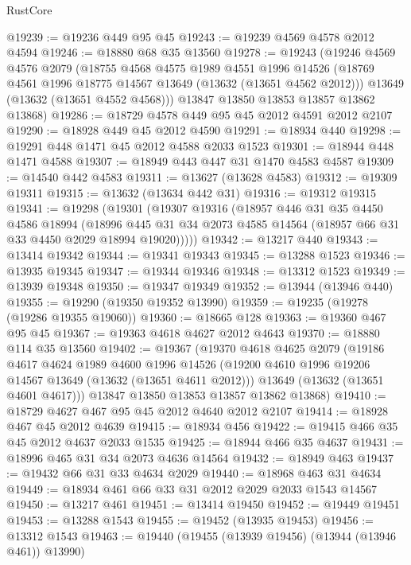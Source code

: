 \begin{lexlean}{RustCore}
\begin{coremodule}
@19239 := @19236 @449 @95 @45
@19243 := @19239 @4569 @4578 @2012 @4594
@19246 := @18880 @68 @35 @13560
@19278 := @19243
    (@19246
      @4569
      @4576
      @2079
      (@18755
        @4568
        @4575
        @1989
        @4551
        @1996
        @14526
        (@18769 @4561 @1996 @18775 @14567 @13649 (@13632 (@13651 @4562 @2012)))
        @13649
        (@13632 (@13651 @4552 @4568)))
      @13847
      @13850
      @13853
      @13857
      @13862
      @13868)
@19286 := @18729 @4578 @449 @95 @45 @2012 @4591 @2012 @2107
@19290 := @18928 @449 @45 @2012 @4590
@19291 := @18934 @440
@19298 := @19291 @448 @1471 @45 @2012 @4588 @2033 @1523
@19301 := @18944 @448 @1471 @4588
@19307 := @18949 @443 @447 @31 @1470 @4583 @4587
@19309 := @14540 @442 @4583
@19311 := @13627 (@13628 @4583)
@19312 := @19309 @19311
@19315 := @13632 (@13634 @442 @31)
@19316 := @19312 @19315
@19341 := @19298
    (@19301
      (@19307
        @19316
        (@18957
          @446
          @31
          @35
          @4450
          @4586
          @18994
          (@18996 @445 @31 @34 @2073 @4585 @14564 (@18957 @66 @31 @33 @4450 @2029 @18994 @19020)))))
@19342 := @13217 @440
@19343 := @13414 @19342
@19344 := @19341 @19343
@19345 := @13288 @1523
@19346 := @13935 @19345
@19347 := @19344 @19346
@19348 := @13312 @1523
@19349 := @13939 @19348
@19350 := @19347 @19349
@19352 := @13944 (@13946 @440)
@19355 := @19290 (@19350 @19352 @13990)
@19359 := @19235 (@19278 (@19286 @19355 @19060))
@19360 := @18665 @128
@19363 := @19360 @467 @95 @45
@19367 := @19363 @4618 @4627 @2012 @4643
@19370 := @18880 @114 @35 @13560
@19402 := @19367
    (@19370
      @4618
      @4625
      @2079
      (@19186
        @4617
        @4624
        @1989
        @4600
        @1996
        @14526
        (@19200 @4610 @1996 @19206 @14567 @13649 (@13632 (@13651 @4611 @2012)))
        @13649
        (@13632 (@13651 @4601 @4617)))
      @13847
      @13850
      @13853
      @13857
      @13862
      @13868)
@19410 := @18729 @4627 @467 @95 @45 @2012 @4640 @2012 @2107
@19414 := @18928 @467 @45 @2012 @4639
@19415 := @18934 @456
@19422 := @19415 @466 @35 @45 @2012 @4637 @2033 @1535
@19425 := @18944 @466 @35 @4637
@19431 := @18996 @465 @31 @34 @2073 @4636 @14564
@19432 := @18949 @463
@19437 := @19432 @66 @31 @33 @4634 @2029
@19440 := @18968 @463 @31 @4634
@19449 := @18934 @461 @66 @33 @31 @2012 @2029 @2033 @1543 @14567
@19450 := @13217 @461
@19451 := @13414 @19450
@19452 := @19449 @19451
@19453 := @13288 @1543
@19455 := @19452 (@13935 @19453)
@19456 := @13312 @1543
@19463 := @19440 (@19455 (@13939 @19456) (@13944 (@13946 @461)) @13990)

\end{coremodule}
\end{lexlean}
